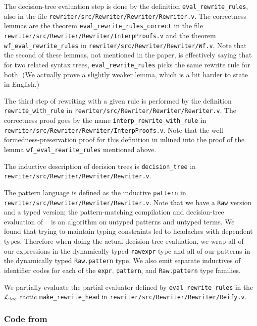 \documentclass[a4paper,USenglish,cleveref,autoref,thm-restate]{lipics-v2021}
\newcommand{\citet}[1]{\usebibentry{#1}{citet}~\cite{#1}}
\newcommand{\Ltac}{\ensuremath{\mathcal{L}_\text{\emph{tac}}}}
\begin{document}
The decision-tree evaluation step is done by the definition \texttt{eval\_rewrite\_rules}, also in the file \texttt{rewriter/src/Rewriter/Rewriter/Rewriter.v}.
The correctness lemmas are the theorem \texttt{eval\_rewrite\_rules\_correct} in the file \texttt{rewriter/src/Rewriter/Rewriter/InterpProofs.v} and the theorem \texttt{wf\_eval\_rewrite\_rules} in \texttt{rewriter/src/Rewriter/Rewriter/Wf.v}.
Note that the second of these lemmas, not mentioned in the paper, is effectively saying that for two related syntax trees, \texttt{eval\_rewrite\_rules} picks the same rewrite rule for both.
(We actually prove a slightly weaker lemma, which is a bit harder to state in English.)

The third step of rewriting with a given rule is performed by the definition \texttt{rewrite\_with\_rule} in \texttt{rewriter/src/Rewriter/Rewriter/Rewriter.v}.
The correctness proof goes by the name \texttt{interp\_rewrite\_with\_rule} in \texttt{rewriter/src/Rewriter/Rewriter/InterpProofs.v}.
Note that the well-formedness-preservation proof for this definition in inlined into the proof of the lemma \verb|wf_eval_rewrite_rules| mentioned above.

The inductive description of decision trees is \verb|decision_tree| in \texttt{rewriter/src/Rewriter/Rewriter/Rewriter.v}.

The pattern language is defined as the inductive \verb|pattern| in \texttt{rewriter/src/Rewriter/Rewriter/Rewriter.v}.
Note that we have a \verb|Raw| version and a typed version; the pattern-matching compilation and decision-tree evaluation of \citet{Aehlig} is an algorithm on untyped patterns and untyped terms.
We found that trying to maintain typing constraints led to headaches with dependent types.
Therefore when doing the actual decision-tree evaluation, we wrap all of our expressions in the dynamically typed \verb|rawexpr| type and all of our patterns in the dynamically typed \verb|Raw.pattern| type.
We also emit separate inductives of identifier codes for each of the \verb|expr|, \verb|pattern|, and \verb|Raw.pattern| type families.

We partially evaluate the partial evaluator defined by \verb|eval_rewrite_rules| in the \Ltac{} tactic \verb|make_rewrite_head| in \texttt{rewriter/src/Rewriter/Rewriter/Reify.v}.

\subsubsection{Code from }
\end{document}
